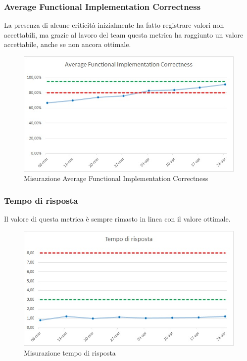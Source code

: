 \subsubsection{Average Functional Implementation Correctness}
La presenza di alcune criticità inizialmente ha fatto registrare valori non accettabili, ma grazie al lavoro del team questa metrica ha raggiunto un valore accettabile, anche se non ancora ottimale.
\begin{figure} [H]
	\centering
	\includegraphics[scale=1]{Img/AFIC}
	\caption{Misurazione Average Functional Implementation Correctness}\label{}
\end{figure}

\subsubsection{Tempo di risposta}
Il valore di questa metrica è sempre rimasto in linea con il valore ottimale.
\begin{figure} [H]
	\centering
	\includegraphics[scale=1]{Img/risp}
	\caption{Misurazione tempo di risposta}\label{}
\end{figure}

